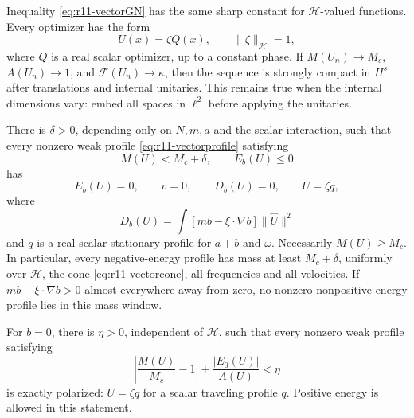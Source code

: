 \begin{theorem}
\label{thm:r11-vectorcompact}
Inequality \eqref{eq:r11-vectorGN} has the same sharp constant for
$\mathcal H$-valued functions. Every optimizer has the form
\[
 U(x)=\zeta Q(x),\qquad \|\zeta\|_{\mathcal H}=1,
\]
where $Q$ is a real scalar optimizer, up to a constant phase.
If $M(U_n)\to M_c$, $A(U_n)\to1$, and
$\mathcal F(U_n)\to\kappa$, then the sequence is strongly compact
in $H^s$ after translations and internal unitaries. This remains
true when the internal dimensions vary: embed all spaces in
$\ell^2$ before applying the unitaries.
\end{theorem}

\begin{theorem}
\label{thm:r11-vectorgap}
There is $\delta>0$, depending only on $N,m,a$ and the scalar
interaction, such that every nonzero weak profile
\eqref{eq:r11-vectorprofile} satisfying
\[
 M(U)<M_c+\delta,\qquad E_b(U)\le0
\]
has
\[
 E_b(U)=0,\qquad v=0,\qquad D_b(U)=0,\qquad U=\zeta q,
\]
where
\[
 D_b(U)=\int[mb-\xi\cdot\nabla b]\|\widehat U\|^2
\]
and $q$ is a real scalar stationary profile for $a+b$ and $\omega$.
Necessarily $M(U)\ge M_c$. In particular, every negative-energy
profile has mass at least $M_c+\delta$, uniformly over $\mathcal H$,
the cone \eqref{eq:r11-vectorcone}, all frequencies and all velocities.
If $mb-\xi\cdot\nabla b>0$ almost everywhere away from zero, no
nonzero nonpositive-energy profile lies in this mass window.
\end{theorem}

\begin{corollary}
\label{cor:r11-vectorpolarization}
For $b=0$, there is $\eta>0$, independent of $\mathcal H$, such that
every nonzero weak profile satisfying
\[
 \left|\frac{M(U)}{M_c}-1\right|+\frac{|E_0(U)|}{A(U)}<\eta
\]
is exactly polarized: $U=\zeta q$ for a scalar traveling profile $q$.
Positive energy is allowed in this statement.
\end{corollary}

